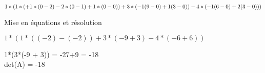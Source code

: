 $
1*(\\
  1*(+1*(0 - 2)-2*(0 - 1)+1*(0 - 0))\\
  +3*(-1(9 - 0)+1(3 - 0))\\
  -4*(-1(6 - 0)+2(3 - 0))\\
  )
$


\vspace{4mm} %
Mise en équations et résolution
\vspace{5mm} %

$ 1*(1*((-2)-(-2)) +3*(-9 + 3) -4*(-6 +6 ))$

1*(3*(-9 + 3)) = -27+9 = -18\\

det(A) = -18\\
